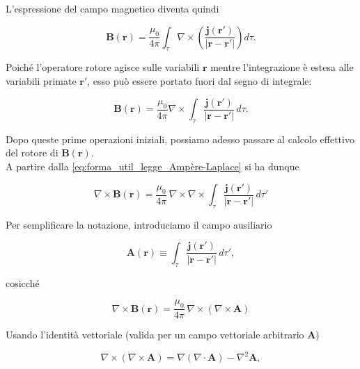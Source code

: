 L'espressione del campo magnetico diventa quindi

\begin{equation*}
    \mathbf{B}(\mathbf{r})
    =
    \frac{\mu_0}{4 \pi}
    \int_{\tau}
    \nabla \times
    \left(
    \frac{\mathbf j(\mathbf r')}{|\mathbf r - \mathbf r'|}
    \right) d\tau.
\end{equation*}

Poiché l'operatore rotore agisce sulle variabili $\mathbf r$ mentre l'integrazione è estesa alle variabili primate $\mathbf r'$, esso può essere portato fuori dal segno di integrale:

\begin{equation} \label{eq:forma_util_legge_Ampère-Laplace}
    \mathbf{B}(\mathbf{r})
    =
    \frac{\mu_0}{4 \pi}
    \nabla \times
    \int_{\tau}
    \frac{\mathbf j(\mathbf r')}{|\mathbf r - \mathbf r'|} \, d\tau.
\end{equation}

Dopo queste prime operazioni iniziali, possiamo adesso passare al calcolo effettivo del rotore di $\mathbf{B}(\mathbf{r})$. \\

A partire dalla \ref{eq:forma_util_legge_Ampère-Laplace} si ha dunque

\begin{equation*}
    \nabla \times \mathbf B(\mathbf r)
    =
    \frac{\mu_0}{4\pi}\,
    \nabla \times \nabla \times
    \int_{\tau}\frac{\mathbf j(\mathbf r')}{|\mathbf r-\mathbf r'|}\,d\tau'
\end{equation*}

Per semplificare la notazione, introduciamo il campo ausiliario

\begin{equation*}
    \mathbf A(\mathbf r)\equiv \int_{\tau}\frac{\mathbf j(\mathbf r')}{|\mathbf r-\mathbf r'|}\,d\tau',
\end{equation*}

cosicché

\begin{equation}\label{eq:curlcurlA}
    \nabla \times \mathbf B(\mathbf r)
    =
    \frac{\mu_0}{4\pi}\,\nabla \times (\nabla \times \mathbf A)
\end{equation}

Usando l'identità vettoriale (valida per un campo vettoriale arbitrario $\mathbf A$)

\begin{equation}
    \nabla \times (\nabla \times \mathbf A)=\nabla(\nabla\cdot \mathbf A)-\nabla^2\mathbf A,
\end{equation}

